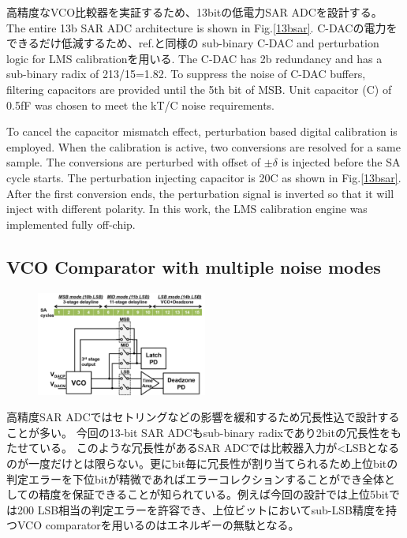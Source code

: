 \documentclass[letterpaper, 10 pt, conference]{ieeeconf}  %
\begin{document}
高精度なVCO比較器を実証するため、13bitの低電力SAR ADCを設計する。
The entire 13b SAR ADC architecture is shown in Fig.\ref{13bsar}. C-DACの電力をできるだけ低減するため、ref.\cite{liu201012b}と同様の sub-binary C-DAC and perturbation logic for LMS calibrationを用いる. The C-DAC has 2b redundancy and has a sub-binary radix of 213/15=1.82. To suppress the noise of C-DAC buffers, filtering capacitors \cite{miki20154} are provided until the 5th bit of MSB. Unit capacitor (C) of 0.5fF was chosen  to meet the kT/C noise requirements.

To cancel the capacitor mismatch effect, perturbation based digital calibration \cite{liu201012b} is employed. When the calibration is active, two conversions are resolved for a same sample. The conversions are perturbed with offset of $\pm \delta$ is injected before the SA cycle starts. The perturbation injecting capacitor is 20C as shown in Fig.\ref{13bsar}. After the first conversion ends, the perturbation signal is inverted so that it will inject with different polarity. In this work, the LMS calibration engine was implemented fully off-chip.

\subsection{VCO Comparator with multiple noise modes}
\begin{figure}[ht!]
\centering
 \includegraphics[width=0.5\textwidth]{figs/vco-entire-r1.png}
  \label{fullvco}
\end{figure}

高精度SAR ADCではセトリングなどの影響を緩和するため冗長性込で設計することが多い。
今回の13-bit SAR ADCもsub-binary radixであり2bitの冗長性をもたせている。
このような冗長性があるSAR ADCでは比較器入力が<LSBとなるのが一度だけとは限らない。更にbit毎に冗長性が割り当てられるため上位bitの判定エラーを下位bitが精微であればエラーコレクションすることができ全体としての精度を保証できることが知られている\cite{kapusta201314b}。例えば今回の設計では上位5bitでは200 LSB相当の判定エラーを許容でき、上位ビットにおいてsub-LSB精度を持つVCO comparatorを用いるのはエネルギーの無駄となる。
\end{document}
